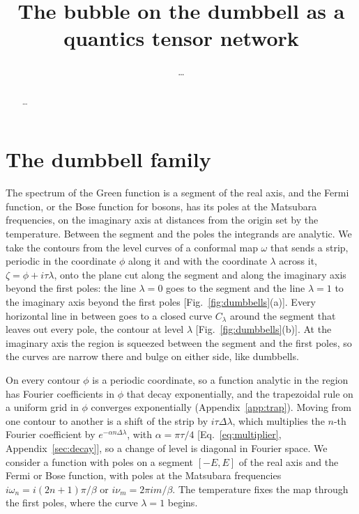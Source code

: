 \documentclass[aps,prb,reprint,a4paper]{revtex4-2}
\begin{document}
\raggedbottom%

\title{The bubble on the dumbbell as a quantics tensor network}
\author{\ldots}

\begin{abstract}
\ldots
\end{abstract}

\maketitle

\section{The dumbbell family}
\label{sec:dumbbell}

The spectrum of the Green function is a segment of the real axis, and the Fermi function, or the Bose function for bosons, has its poles at the Matsubara frequencies, on the imaginary axis at distances from the origin set by the temperature. Between the segment and the poles the integrands are analytic. We take the contours from the level curves of a conformal map $\omega$ that sends a strip, periodic in the coordinate $\phi$ along it and with the coordinate $\lambda$ across it, $\zeta=\phi+i\tau\lambda$, onto the plane cut along the segment and along the imaginary axis beyond the first poles: the line $\lambda=0$ goes to the segment and the line $\lambda=1$ to the imaginary axis beyond the first poles [Fig.~\ref{fig:dumbbells}(a)]. Every horizontal line in between goes to a closed curve $C_\lambda$ around the segment that leaves out every pole, the contour at level $\lambda$ [Fig.~\ref{fig:dumbbells}(b)]. At the imaginary axis the region is squeezed between the segment and the first poles, so the curves are narrow there and bulge on either side, like dumbbells.

On every contour $\phi$ is a periodic coordinate, so a function analytic in the region has Fourier coefficients in $\phi$ that decay exponentially, and the trapezoidal rule on a uniform grid in $\phi$ converges exponentially (Appendix~\ref{app:trap}). Moving from one contour to another is a shift of the strip by $i\tau\Delta\lambda$, which multiplies the $n$-th Fourier coefficient by $e^{-\alpha n\Delta\lambda}$, with $\alpha=\pi\tau/4$ [Eq.~\eqref{eq:multiplier}, Appendix~\ref{sec:decay}], so a change of level is diagonal in Fourier space. We consider a function with poles on a segment $[-E,E]$ of the real axis and the Fermi or Bose function, with poles at the Matsubara frequencies $i\omega_n=i(2n+1)\pi/\beta$ or $i\nu_m=2\pi im/\beta$. The temperature fixes the map through the first poles, where the curve $\lambda=1$ begins.
\end{document}
